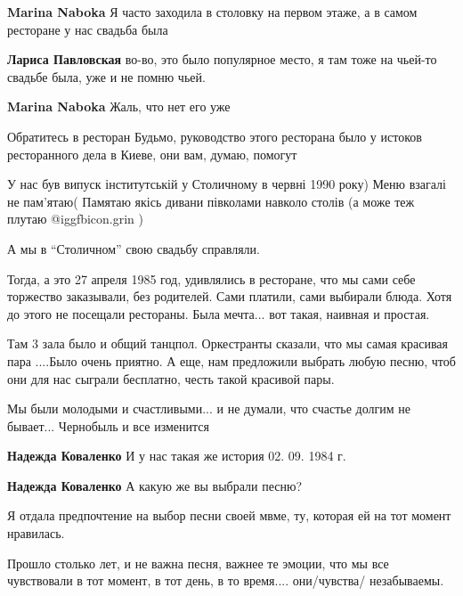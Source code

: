 \begin{itemize}
\begin{itemize} %
\textbf{Marina Naboka} Я часто заходила в столовку на первом этаже, а в самом ресторане у нас свадьба была

\textbf{Лариса Павловская} во-во, это было популярное место, я там тоже на чьей-то свадьбе была, уже и не помню чьей.

\textbf{Marina Naboka} Жаль, что нет его уже
\end{itemize} %


Обратитесь в ресторан Будьмо, руководство этого ресторана было у истоков
ресторанного дела в Киеве, они вам, думаю, помогут


У нас був випуск інститутській у Столичному в червні 1990 року) Меню взагалі не
пам'ятаю( Памятаю якісь дивани півколами навколо столів (а може теж плутаю  @igg{fbicon.grin} )


А мы в \enquote{Столичном} свою свадьбу справляли.

Тогда, а это 27 апреля 1985 год, удивлялись в ресторане, что мы сами себе
торжество заказывали, без родителей. Сами платили, сами выбирали блюда. Хотя до
этого не посещали рестораны. Была мечта... вот такая, наивная и простая.

Там 3 зала было и общий танцпол. Оркестранты сказали, что мы самая красивая
пара ....Было очень приятно. А еще, нам предложили выбрать любую песню, чтоб
они для нас сыграли бесплатно, честь такой красивой пары.

Мы были молодыми и счастливыми... и не думали, что счастье долгим не бывает...
Чернобыль и все изменится

\begin{itemize} %
\textbf{Надежда Коваленко} И у нас такая же история 02. 09. 1984 г.

\textbf{Надежда Коваленко} А какую же вы выбрали песню?


Я отдала предпочтение на выбор песни своей мвме, ту, которая ей на тот момент
нравилась.

Прошло столько лет, и не важна песня, важнее те эмоции, что мы все чувствовали
в тот момент, в тот день, в то время.... они/чувства/ незабываемы.


\end{itemize}
\end{itemize}
